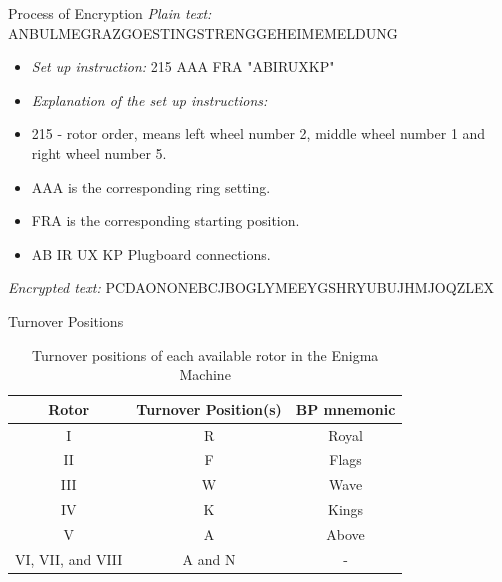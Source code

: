 \documentclass{beamer}
\begin{document}
\begin{frame}{Process of Encryption}
\textit{Plain text:} ANBULMEGRAZGOESTINGSTRENGGEHEIMEMELDUNG
\begin{itemize}
    \item \textit{Set up instruction:} 215 AAA FRA "ABIRUXKP" 
    \item \textit{Explanation of the set up instructions: }
    \item \par 215 - rotor order, means left wheel number 2, middle wheel number 1 and right wheel number 5. 
    \item \par AAA is the corresponding ring setting.
    \item \par FRA is the corresponding starting position.
    \item \par AB IR UX KP Plugboard connections.
\end{itemize}
\textit{Encrypted text:} PCDAONONEBCJBOGLYMEEYGSHRYUBUJHMJOQZLEX
\end{frame}

\begin{frame}{Turnover Positions}
    \begin{table}[hbt!]
    \caption{Turnover positions of each available rotor in the Enigma Machine}
    \centering 
    \begin{tabular}{c|c|c}
    \hline\hline 
    Rotor & Turnover Position(s) & BP mnemonic  \\
    \hline 
    I & R & Royal    \\
    II & F & Flags   \\
    III & W & Wave  \\
    IV & K & Kings \\
    V & A & Above  \\
    VI, VII, and VIII & A and N & - 
    \end{tabular}
    \end{table}
\end{frame}
\end{document}
